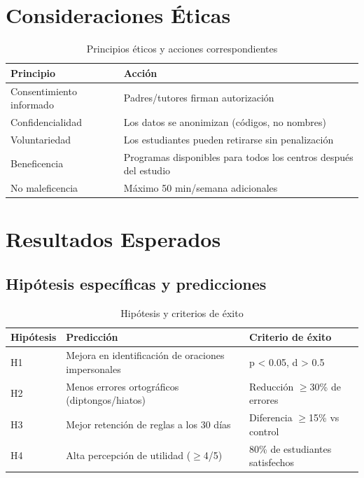 \documentclass[12pt,spanish]{article}
\begin{document}
\newpage
\section{Consideraciones Éticas}

\begin{table}[H]
\centering
\caption{Principios éticos y acciones correspondientes}
\label{tab:etica}
\begin{tabular}{|p{4cm}|p{9cm}|}
\hline
\textbf{Principio} & \textbf{Acción} \\
\hline
Consentimiento informado & Padres/tutores firman autorización \\
\hline
Confidencialidad & Los datos se anonimizan (códigos, no nombres) \\
\hline
Voluntariedad & Los estudiantes pueden retirarse sin penalización \\
\hline
Beneficencia & Programas disponibles para todos los centros después del estudio \\
\hline
No maleficencia & Máximo 50 min/semana adicionales \\
\hline
\end{tabular}
\end{table}

\newpage
\section{Resultados Esperados}

\subsection{Hipótesis específicas y predicciones}

\begin{table}[H]
\centering
\caption{Hipótesis y criterios de éxito}
\label{tab:hipotesis}
\begin{tabular}{|p{3cm}|p{5cm}|p{5cm}|}
\hline
\textbf{Hipótesis} & \textbf{Predicción} & \textbf{Criterio de éxito} \\
\hline
H1 & Mejora en identificación de oraciones impersonales & p < 0.05, d > 0.5 \\
\hline
H2 & Menos errores ortográficos (diptongos/hiatos) & Reducción $\geq$30\% de errores \\
\hline
H3 & Mejor retención de reglas a los 30 días & Diferencia $\geq$15\% vs control \\
\hline
H4 & Alta percepción de utilidad ($\geq$4/5) & 80\% de estudiantes satisfechos \\
\hline
\end{tabular}
\end{table}
\end{document}
